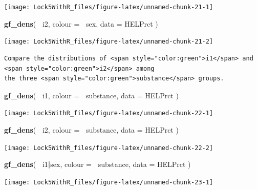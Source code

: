 \documentclass[]{book}
\newenvironment{Shaded}{\begin{snugshade}}{\end{snugshade}}
\newcommand{\DataTypeTok}[1]{\textcolor[rgb]{0.13,0.29,0.53}{#1}}
\newcommand{\KeywordTok}[1]{\textcolor[rgb]{0.13,0.29,0.53}{\textbf{#1}}}
\newcommand{\NormalTok}[1]{#1}
\newcommand{\OperatorTok}[1]{\textcolor[rgb]{0.81,0.36,0.00}{\textbf{#1}}}
\begin{document}
\texttt{[image: Lock5WithR\_files/figure-latex/unnamed-chunk-21-1]}

\begin{Shaded}
\begin{Highlighting}[]
\KeywordTok{gf_dens}\NormalTok{( }\OperatorTok{~}\NormalTok{i2, }\DataTypeTok{colour =} \OperatorTok{~}\NormalTok{sex, }\DataTypeTok{data =}\NormalTok{ HELPrct )}
\end{Highlighting}
\end{Shaded}

\texttt{[image: Lock5WithR\_files/figure-latex/unnamed-chunk-21-2]}

\begin{verbatim}
Compare the distributions of <span style="color:green">i1</span> and <span style="color:green">i2</span> among 
the three <span style="color:green">substance</span> groups.
\end{verbatim}

\begin{Shaded}
\begin{Highlighting}[]
\KeywordTok{gf_dens}\NormalTok{( }\OperatorTok{~}\NormalTok{i1, }\DataTypeTok{colour =} \OperatorTok{~}\NormalTok{substance, }\DataTypeTok{data =}\NormalTok{ HELPrct )}
\end{Highlighting}
\end{Shaded}

\texttt{[image: Lock5WithR\_files/figure-latex/unnamed-chunk-22-1]}

\begin{Shaded}
\begin{Highlighting}[]
\KeywordTok{gf_dens}\NormalTok{( }\OperatorTok{~}\NormalTok{i2, }\DataTypeTok{colour =} \OperatorTok{~}\NormalTok{substance, }\DataTypeTok{data =}\NormalTok{ HELPrct )}
\end{Highlighting}
\end{Shaded}

\texttt{[image: Lock5WithR\_files/figure-latex/unnamed-chunk-22-2]}

\begin{Shaded}
\begin{Highlighting}[]
\KeywordTok{gf_dens}\NormalTok{( }\OperatorTok{~}\NormalTok{i1}\OperatorTok{|}\NormalTok{sex, }\DataTypeTok{colour =} \OperatorTok{~}\NormalTok{substance, }\DataTypeTok{data =}\NormalTok{ HELPrct )}
\end{Highlighting}
\end{Shaded}

\texttt{[image: Lock5WithR\_files/figure-latex/unnamed-chunk-23-1]}
\end{document}
